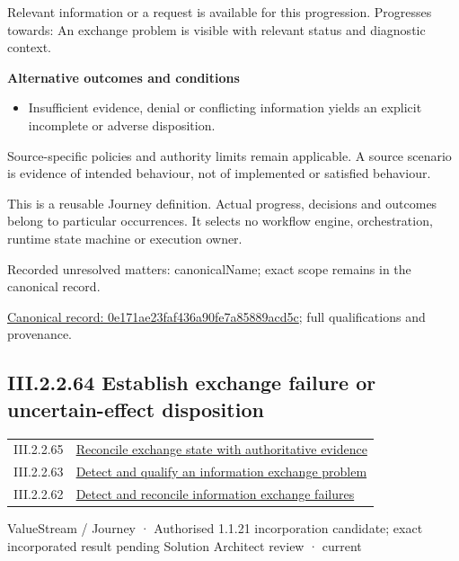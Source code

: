 Relevant information or a request is available for this progression. Progresses towards: An exchange problem is visible with relevant status and diagnostic context.



\par\medskip\textbf{Alternative outcomes and conditions}\par


\begin{itemize}


\item Insufficient evidence, denial or conflicting information yields an explicit incomplete or adverse disposition.

\end{itemize}


Source-specific policies and authority limits remain applicable. A source scenario is evidence of intended behaviour, not of implemented or satisfied behaviour.



This is a reusable Journey definition. Actual progress, decisions and outcomes belong to particular occurrences. It selects no workflow engine, orchestration, runtime state machine or execution owner.


{\small Recorded unresolved matters: canonicalName; exact scope remains in the canonical record.}\par
{\footnotesize \href{../../../../continuum/strategy/value-stream/0e171ae23faf436a90fe7a85889acd5c.md}{Canonical record: 0e171ae23faf436a90fe7a85889acd5c}; full qualifications and provenance.}\par
\subsection*{III.2.2.64 Establish exchange failure or uncertain-effect disposition}
\label{navigation:III.2.2.64}

\begin{longtable}{p{.22\linewidth}p{.73\linewidth}}
III.2.2.65 & \hyperref[element:08c2d05dd0174cc28288ed4ab0bc05d2]{Reconcile exchange state with authoritative evidence} \\
III.2.2.63 & \hyperref[element:0e171ae23faf436a90fe7a85889acd5c]{Detect and qualify an information exchange problem} \\
III.2.2.62 & \hyperref[element:ad3479bfcefb4cc4b562e146f68eb579]{Detect and reconcile information exchange failures} \\
\end{longtable}
\label{element:f49ed7138ad1435a94cb1f509aaf0b8d}
{\small ValueStream / Journey · Authorised 1.1.21 incorporation candidate; exact incorporated result pending Solution Architect review · current}\par

